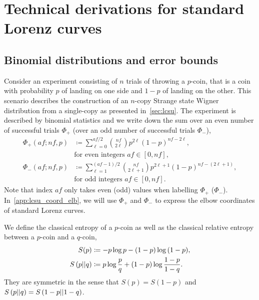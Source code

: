 \section{Technical derivations for standard Lorenz curves}
\label{app:lcsu_technical}

\subsection{Binomial distributions and error bounds}\label{app:phi}
Consider an experiment consisting of $n$ trials of throwing a $p$-coin, that is a coin with probability $p$ of landing on one side and $1-p$ of landing on the other.
This scenario describes the construction of an $n$-copy Strange state Wigner distribution from a single-copy as presented in~\cref{sec:lcsu}.
The experiment is described by binomial statistics and we write down the sum over an even number of successful trials $\Phi_+$ (over an odd number of successful trials $\Phi_-$),
\begin{align}	
	\Phi_+(af; nf, p) &\coloneqq \sum\limits_{\ell=0}^{af/2} \binom{nf}{2\ell} p^{2\ell} (1-p)^{nf-2\ell}, \nonumber\\ 
	&\text{for even integers } af\in[0,nf], \label{eq:fp_app} \\
	\Phi_-(af; nf, p) &\coloneqq \sum\limits_{\ell=1}^{(af-1)/2} \binom{nf}{2\ell+1} p^{2\ell+1} (1-p)^{nf-(2\ell+1)}, \nonumber\\ 
	&\text{for odd integers } af\in[0,nf]. \label{eq:fn_app}
\end{align}
Note that index $af$ only takes even (odd) values when labelling $\Phi_+$ ($\Phi_-$).
In~\cref{app:lcsu_coord_elb}, we will use $\Phi_+$ and $\Phi_-$ to express the elbow coordinates of standard Lorenz curves.

We define the classical entropy of a $p$-coin as well as the classical relative entropy between a $p$-coin and a $q$-coin,
\begin{align}
	S(p) &\coloneqq -p\log{p} -(1-p)\log{(1-p)}, \label{eq:ent}\\
	S\left( p \middle\vert\middle\vert q \right) &\coloneqq p \log{\frac{p}{q}} + (1-p) \log{\frac{1-p}{1-q}}. \label{eq:ent_rel}
\end{align}
They are symmetric in the sense that $S(p) = S(1-p)$ and $S\left( p \middle\vert\middle\vert q \right) = S\left( 1-p \middle\vert\middle\vert 1-q \right)$.

